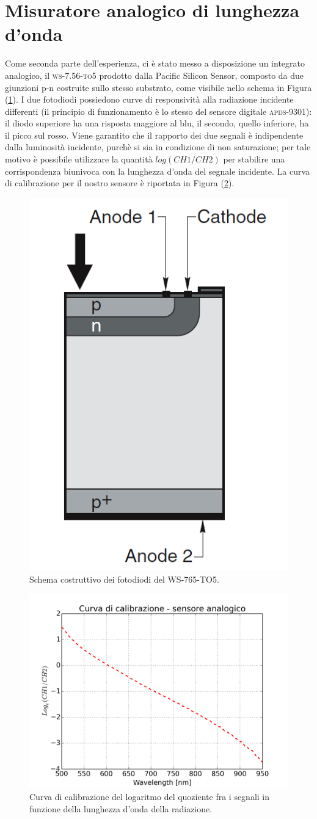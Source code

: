 \documentclass[10pt,letterpaper]{article}
\begin{document}
\section{Misuratore analogico di lunghezza d'onda}
Come seconda parte dell'esperienza, ci è stato messo a disposizione un integrato analogico, il \textsc{ws-7.56-to5} prodotto dalla Pacific Silicon Sensor, composto da due giunzioni p-n costruite sullo stesso substrato, come visibile nello schema in Figura (\ref{fig:schema_analog_sensor}). I due fotodiodi possiedono curve di responsività alla radiazione incidente differenti (il principio di funzionamento è lo stesso del sensore digitale \textsc{apds-9301}): il diodo superiore ha una risposta maggiore al blu, il secondo, quello inferiore, ha il picco sul rosso. Viene garantito che il rapporto dei due segnali è indipendente dalla luminosità incidente, purchè si sia in condizione di non saturazione; per tale motivo è possibile utilizzare la quantità $log(CH1/CH2)$ per stabilire una corrispondenza biunivoca con la lunghezza d'onda del segnale incidente. La curva di calibrazione per il nostro sensore è riportata in Figura (\ref{fig:calibrazione_analog}).\\

\begin{figure}
\centering
\includegraphics[width=0.2\linewidth]{./schema_analog_sensor}
\caption{Schema costruttivo dei fotodiodi del WS-765-TO5.}
\label{fig:schema_analog_sensor}
\end{figure}

\begin{figure}
\centering
\includegraphics[width=0.8\linewidth]{./calibrazione_analog}
\caption{Curva di calibrazione del logaritmo del quoziente fra i segnali in funzione della lunghezza d'onda della radiazione.}
\label{fig:calibrazione_analog}
\end{figure}
\end{document}
